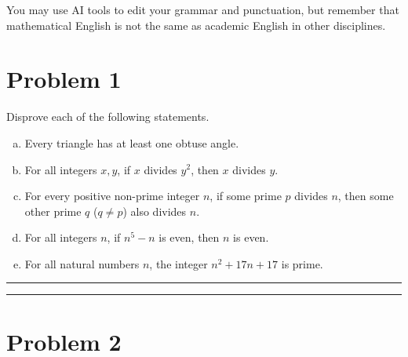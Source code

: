 \documentclass{article}
\theoremstyle{definition}
\newenvironment{solution}{\bigskip\hrule{\hfill}}{\bigskip\hrule{\hfill}} %
\begin{document}
You may use AI tools to edit your grammar and punctuation, but remember that mathematical English is not the same as academic English in other disciplines. 

\vfill

\newpage


\section*{Problem 1}

Disprove each of the following statements.

\begin{enumerate}[a)] %
        \item Every triangle has at least one obtuse angle.
        \item For all integers $x, y$, if $x$ divides $y^2$, then $x$ divides $y$.
        \item For every positive non-prime integer $n$, if some prime $p$ divides $n$, 
            then some other prime $q$ ($q\neq p$) also divides $n$.
        \item For all integers $n$, if $n^5-n$ is even, then $n$ is even.
        \item For all natural numbers $n$, the integer $n^2+17n+17$ is prime.
    \end{enumerate}

\begin{solution}


\end{solution}


\newpage


\section*{Problem 2}
\end{document}
